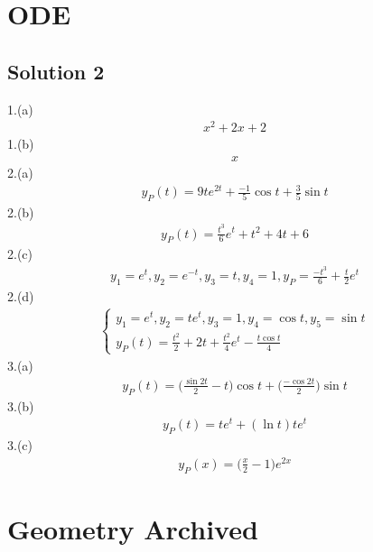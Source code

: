 \documentclass{report}
\begin{document}
\chapter{ODE}
\section{Solution 2}
\begin{mdframed}
1.(a)
\begin{align*}
x^2+2x+2
\end{align*}
1.(b)
\begin{align*}
x
\end{align*}
2.(a)
\begin{align*}
y_P(t)=9te^{2t}+ \frac{-1}{5}\cos t+ \frac{3}{5}\sin t
\end{align*}
2.(b)
\begin{align*}
y_P(t)= \frac{t^3}{6}e^t+t^2+4t+6
\end{align*}
2.(c)
\begin{align*}
y_1=e^t,y_2=e^{-t},y_3=t,y_4=1,y_P=\frac{-t^3}{6}+\frac{t}{2}e^t
\end{align*}
2.(d)
\begin{align*}
\begin{cases}
  y_1=e^t,y_2=te^t, y_3=1,y_4=\cos t, y_5= \sin t\\
  y_P(t)=\frac{t^2}{2}+2t+\frac{t^2}{4}e^t- \frac{t \cos t }{4}
\end{cases}
\end{align*}
3.(a)
\begin{align*}
y_P(t)=\Big(\frac{\sin 2t}{2}-t \Big)\cos t+ \Big(\frac{-\cos 2t}{2} \Big)\sin t
\end{align*}
3.(b)
\begin{align*}
y_P(t)=te^t+(\ln t)te^t
\end{align*}
3.(c)
\begin{align*}
  y_P(x)=\Big(\frac{x}{2}-1 \Big)e^{2x}
\end{align*}
\end{mdframed}
\chapter{Geometry Archived}
\end{document}
